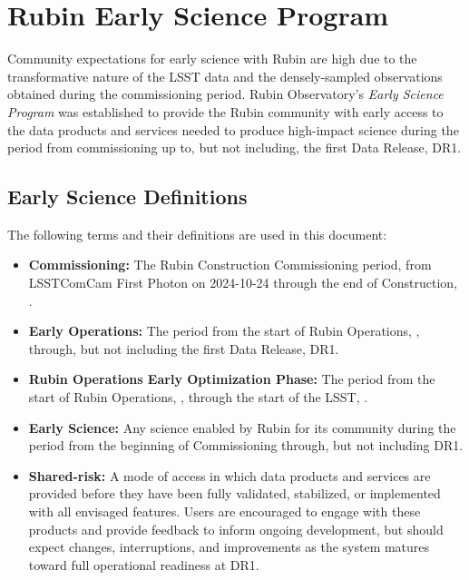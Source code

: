 \section{Rubin Early Science Program}

Community expectations for early science with Rubin are high due to the transformative nature of the LSST data and the densely-sampled observations obtained during the commissioning period.
Rubin Observatory's \emph{Early Science Program} was established to provide the Rubin community with early access to the data products and services needed to produce high-impact science during the period from commissioning up to, but not including, the first Data Release, DR1.

\subsection{Early Science Definitions}
\label{ssec:defn}

The following terms and their definitions are used in this document:
\begin{itemize}

\item\textbf{Commissioning:} The Rubin Construction Commissioning period, from LSSTComCam First Photon on 2024-10-24 through the end of Construction, \cstrcompdate.
\item\textbf{Early Operations:} The period from the start of Rubin Operations, \opsstartdate, through, but not including the first Data Release, DR1.

\item\textbf{Rubin Operations Early Optimization Phase:} The period from the start of Rubin Operations, \opsstartdate, through the start of the LSST, \lsststartdate.

\item\textbf{Early Science:} Any science enabled by Rubin for its community during the period from the beginning of Commissioning through, but not including DR1.

\item\textbf{Shared-risk:} A mode of access in which data products and services are provided before they have been fully validated, stabilized, or implemented with all envisaged features. Users are encouraged to engage with these products and provide feedback to inform ongoing development, but should expect changes, interruptions, and improvements as the system matures toward full operational readiness at DR1.
\end{itemize}

